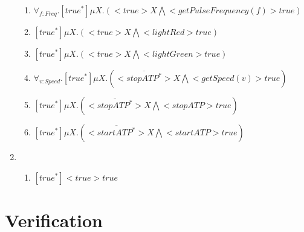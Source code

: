 \documentclass[11pt,a4paper]{article}
\begin{document}
\begin{enumerate}
\begin{enumerate}
\item $\forall _{f:Freq} . [true^*] \mu X . (<true> X \bigwedge <getPulseFrequency(f)> true)$\\
\item $[true^*] \mu X . (<true> X \bigwedge <lightRed> true)$\\
\item $[true^*] \mu X . (<true> X \bigwedge <lightGreen> true)$\\
\item $\forall _{v:Speed} . [true^*] \mu X . (<\overline{stopATP^*}> X \bigwedge <getSpeed(v)> true)$\\
\item $[true^*] \mu X . (<\overline{stopATP^*}> X \bigwedge <stopATP> true)$\\
\item $[ true^*] \mu X . (<\overline{startATP^*}> X \bigwedge <startATP> true)$\\
\end{enumerate}
\item
\begin{enumerate}
\item $[ true^*]<true>true$
\end{enumerate}
\end{enumerate}


\newpage

\section{Verification}
\end{document}
